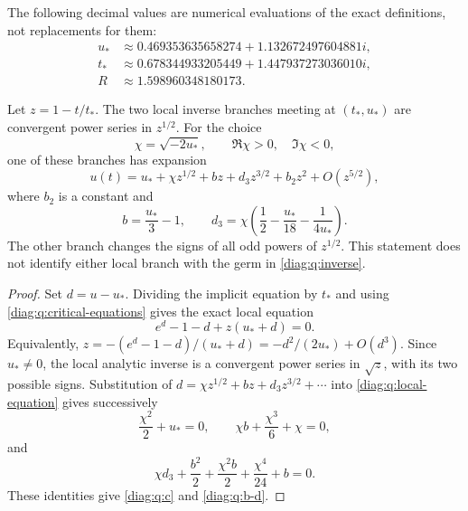 The following decimal values are numerical evaluations of the exact
definitions, not replacements for them:
\begin{align*}
 u_*&\approx0.469353635658274+1.132672497604881i,\\
 t_*&\approx0.678344933205449+1.447937273036010i,\\
 R&\approx1.598960348180173.
\end{align*}

\begin{proposition}
\label{diag:q:local}
Let $z=1-t/t_*$.  The two local inverse branches meeting at $(t_*,u_*)$
are convergent power series in $z^{1/2}$.  For the choice
\begin{equation}\label{diag:q:c}
 \chi=\sqrt{-2u_*},\qquad \Re \chi>0,\quad\Im \chi<0,
\end{equation}
one of these branches has expansion
\begin{equation}\label{diag:q:puiseux}
 u(t)=u_*+\chi z^{1/2}+b z+d_3 z^{3/2}+b_2z^2+O(z^{5/2}),
\end{equation}
where $b_2$ is a constant and
\begin{equation}\label{diag:q:b-d}
 b=\frac{u_*}{3}-1,\qquad
 d_3=\chi\left(\frac12-\frac{u_*}{18}-\frac1{4u_*}\right).
\end{equation}
The other branch changes the signs of all odd powers of $z^{1/2}$.
This statement does not identify either local branch with the germ in
\eqref{diag:q:inverse}.
\end{proposition}

\begin{proof}
Set $d=u-u_*$.  Dividing the implicit equation by $t_*$ and using
\eqref{diag:q:critical-equations} gives the exact local equation
\begin{equation}\label{diag:q:local-equation}
 e^d-1-d+z(u_*+d)=0.
\end{equation}
Equivalently,
$z=-(e^d-1-d)/(u_*+d)=-d^2/(2u_*)+O(d^3)$.
Since $u_*\neq0$, the local analytic inverse is a convergent power series
in $\sqrt z$, with its two possible signs.  Substitution of
$d=\chi z^{1/2}+b z+d_3z^{3/2}+\cdots$ into
\eqref{diag:q:local-equation} gives successively
\[
 \frac{\chi^2}{2}+u_*=0,\qquad
 \chi b+\frac{\chi^3}{6}+\chi=0,
\]
and
\[
 \chi d_3+\frac{b^2}{2}+\frac{\chi^2b}{2}+\frac{\chi^4}{24}+b=0.
\]
These identities give \eqref{diag:q:c} and \eqref{diag:q:b-d}.
\end{proof}

